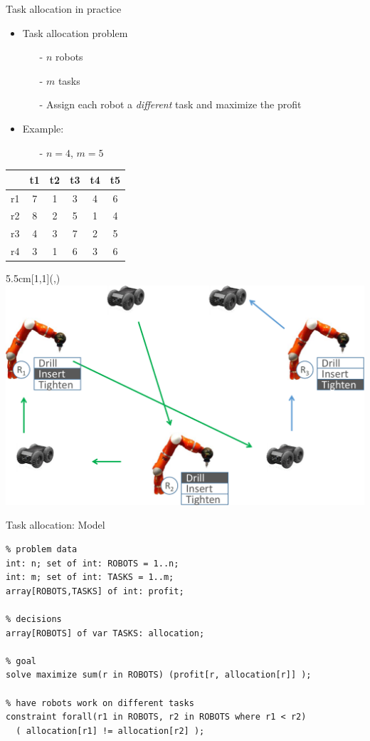 \begin{frame}{Task allocation in practice}

\vspace*{1cm}

\begin{itemize}
\item Task allocation problem

\begin{itemize}
\item [-] $n$ robots 
\item [-] $m$ tasks
\item [-] Assign each robot a \emph{different} task and maximize the profit
\end{itemize}
\item Example:
\begin{itemize}
\item[-] $n = 4$, $m = 5$
\end{itemize}
\end{itemize}
\centering
\begin{tabular}{|c|c|c|c|c|c|}
\hline 
 & t1 & t2 & t3 & t4 & t5 \\ 
\hline 
r1 & 7 & 1 & 3 & 4 & 6 \\ 
\hline 
r2 & 8 & 2 & 5 & 1 & 4 \\ 
\hline 
r3 & 4 & 3 & 7 & 2 & 5 \\ 
\hline 
r4 & 3 & 1 & 6 & 3 & 6 \\ 
\hline 
\end{tabular} 

\begin{textblock*}{5.5cm}[1,1](\textwidth-1cm,\textheight-5.33cm)
\includegraphics[width=.7\textwidth]{img/produktionszelle.pdf}
\end{textblock*}

\end{frame}


\begin{frame}[fragile]{Task allocation: Model}
\begin{lstlisting}
% problem data 
int: n; set of int: ROBOTS = 1..n;
int: m; set of int: TASKS = 1..m;
array[ROBOTS,TASKS] of int: profit;

% decisions
array[ROBOTS] of var TASKS: allocation;

% goal
solve maximize sum(r in ROBOTS) (profit[r, allocation[r]] );

% have robots work on different tasks
constraint forall(r1 in ROBOTS, r2 in ROBOTS where r1 < r2) 
  ( allocation[r1] != allocation[r2] );
\end{lstlisting}
\end{frame}

